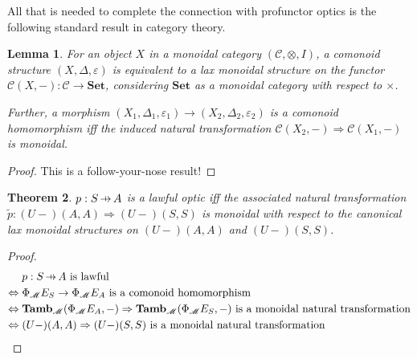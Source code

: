 \documentclass[11pt,letterpaper]{article}
\theoremstyle{plain}
\newtheorem{theorem}{Theorem}[subsection]
\newtheorem{lemma}[theorem]{Lemma}
\theoremstyle{definition}
\newcommand{\C}{\mathscr{C}}
\newcommand{\M}{\mathscr{M}}
\newcommand{\Pastro}{\Phi}
\newcommand{\Set}{\mathbf{Set}}
\newcommand{\Tamb}{\mathbf{Tamb}}
\newcommand{\id}{\mathrm{id}}
\newcommand{\hto}{\ensuremath{\,\mathaccent\shortmid\rightarrow\,}}
\begin{document}
All that is needed to complete the connection with profunctor optics is the following standard result in category theory.

\begin{lemma}
  For an object $X$ in a monoidal category $(\C, \otimes, I)$, a comonoid structure $(X,\Delta,\varepsilon)$ is equivalent to a lax monoidal structure on the functor $\C(X, -) : \C \to \Set$, considering $\Set$ as a monoidal category with respect to $\times$. 
  
  Further, a morphism $(X_1,\Delta_1,\varepsilon_1) \to (X_2,\Delta_2,\varepsilon_2)$ is a comonoid homomorphism iff the induced natural transformation $\C(X_2, -) \Rightarrow \C(X_1, -)$ is monoidal.
\end{lemma}
\begin{proof}
This is a follow-your-nose result!
%
\end{proof}

\begin{theorem}
  $p : S \hto A$ is a lawful optic iff the associated natural transformation $\tilde{p} : (U-)(A,A) \Rightarrow (U-)(S,S)$ is monoidal with respect to the canonical lax monoidal structures on $(U-)(A,A)$ and $(U-)(S,S)$.
\end{theorem}
\begin{proof}
\begin{align*}
& p : S \hto A \text{ is lawful} \\
\Leftrightarrow\; & \Pastro_\M E_S \to \Pastro_\M E_A \text{ is a comonoid homomorphism} \\
\Leftrightarrow\; & \Tamb_\M(\Pastro_\M E_A, -) \Rightarrow \Tamb_\M(\Pastro_\M E_S, -) \text{ is a monoidal natural transformation} \\
\Leftrightarrow\; & (U-)(A, A) \Rightarrow (U-)(S, S) \text{ is a monoidal natural transformation}
\end{align*}
\end{proof}
\end{document}

